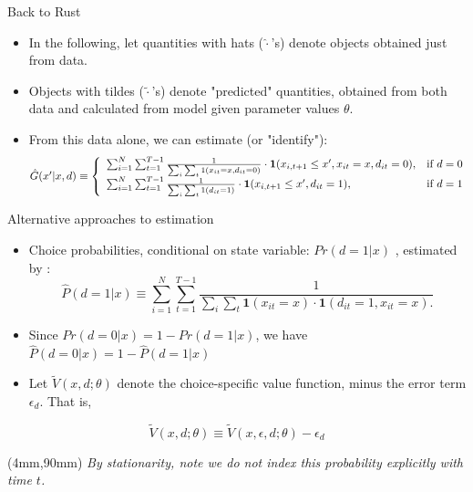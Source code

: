 \documentclass[xcolor=pdftex,dvipsnames,table,mathserif]{beamer}
\newenvironment{reference}[2]{%
  \begin{textblock*}{\textwidth}(#1,#2) 
      \footnotesize\it\bgroup\color{red!50!black}}{\egroup\end{textblock*}}
\begin{document}
\begin{frame}{Back to Rust}
\begin{itemize}
\item In the following, let quantities with hats ($\hat \cdot$'s) denote objects obtained just from data.
\item Objects with tildes ($\tilde \cdot $'s) denote "predicted" quantities, obtained from both data and calculated from model given parameter values $\theta$. 
\item  From this data alone, we can estimate (or "identify"):
\begin{equation*}
\resizebox{.9999999\hsize}{!}{$ \hat G (x' | x, d) \equiv \left \{
\begin{array}{lc} 
\sum^N_{i=1} \sum^{T-1}_{t=1} \frac{1}{\sum_i \sum_t 1 (x_{it} = x, d_{it} = 0)} \cdot \mathbf{1} (x_{i, t+1} \leq x', x_{it} = x, d_{it} = 0), & \text{if } d = 0 \\
\sum^N_{i=1} \sum^{T-1}_{t=1} \frac{1}{\sum_i \sum_t 1 (d_{it}=1)} \cdot \mathbf{1} (x_{i,t+1} \leq x', d_{it} = 1), & \text{if } d =1
\end{array}
\right . $}
\end{equation*}
\end{itemize}
\end{frame}

\begin{frame}{Alternative approaches to estimation}
\begin{itemize}
\item Choice probabilities, conditional on state variable: $Pr(d = 1 | x)$  , estimated by :
\begin{equation*}
\hat P (d = 1| x) \equiv \sum^N_{i=1} \sum^{T-1}_{t=1} \frac{1}{\sum_i \sum_t \mathbf{1} (x_{it} = x ) \cdot \mathbf{1} (d_{it} =1, x_{it} = x).}
\end{equation*}
\item  Since  $Pr(d = 0 | x) = 1 - Pr(d=1 |x)$, we have $\hat{P} (d = 0 | x) = 1 - \hat{P}(d = 1|x)$
\item Let $\tilde V (x, d ; \theta)$ denote the choice-specific value function, minus the error term $\epsilon_d$. That is,
\end{itemize}
\begin{equation*}
\tilde V (x, d; \theta) \equiv \tilde V (x, \epsilon, d; \theta) - \epsilon_d
\end{equation*}
\begin{reference}{4mm}{90mm}
By stationarity, note we do not index this probability explicitly with time $t$.
\end{reference}
\end{frame}
\end{document}
